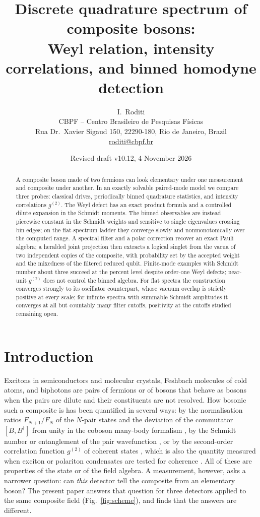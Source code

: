 \documentclass[11pt,a4paper]{article}
\title{Discrete quadrature spectrum of composite bosons:\\ Weyl relation, intensity correlations, and binned homodyne detection}
\author{I.~Roditi\\[4pt]
\small CBPF -- Centro Brasileiro de Pesquisas F\'isicas\\
\small Rua Dr.~Xavier Sigaud 150, 22290-180, Rio de Janeiro, Brazil\\
\small \href{mailto:roditi@cbpf.br}{roditi@cbpf.br}}
\date{Revised draft v10.12, 4 November 2026}
\begin{document}
\maketitle

\begin{abstract}
A composite boson made of two fermions can look elementary under one measurement and composite under another. In an exactly solvable paired-mode model we compare three probes: classical drives, periodically binned quadrature statistics, and intensity correlations $g^{(2)}$. The Weyl defect has an exact product formula and a controlled dilute expansion in the Schmidt moments. The binned observables are instead piecewise constant in the Schmidt weights and sensitive to single eigenvalues crossing bin edges; on the flat-spectrum ladder they converge slowly and nonmonotonically over the computed range. A spectral filter and a polar correction recover an exact Pauli algebra; a heralded joint projection then extracts a logical singlet from the vacua of two independent copies of the composite, with probability set by the accepted weight and the mixedness of the filtered reduced qubit. Finite-mode examples with Schmidt number about three succeed at the percent level despite order-one Weyl defects; near-unit $g^{(2)}$ does not control the binned algebra. For flat spectra the construction converges strongly to its oscillator counterpart, whose vacuum overlap is strictly positive at every scale; for infinite spectra with summable Schmidt amplitudes it converges at all but countably many filter cutoffs, positivity at the cutoffs studied remaining open.
\end{abstract}

\section{Introduction}

Excitons in semiconductors and molecular crystals, Feshbach molecules of cold atoms, and biphotons are pairs of fermions or of bosons that behave as bosons when the pairs are dilute and their constituents are not resolved. How bosonic such a composite is has been quantified in several ways: by the normalisation ratios $F_{N+1}/F_N$ of the $N$-pair states and the deviation of the commutator $[B,B^\dagger]$ from unity in the coboson many-body formalism \cite{Combescot2008,CombescotShiau2015,Shiau2017,Figueiredo2026}, by the Schmidt number or entanglement of the pair wavefunction \cite{Law2005,Chudzicki2010,Tichy2012,Tichy2014}, or by the second-order correlation function $g^{(2)}$ of coherent states \cite{Shiau2017}, which is also the quantity measured when exciton or polariton condensates are tested for coherence \cite{Kasprzak2006,Deng2010,Combescot2017}. All of these are properties of the state or of the field algebra. A measurement, however, asks a narrower question: can \emph{this} detector tell the composite from an elementary boson? The present paper answers that question for three detectors applied to the same composite field (Fig.~\ref{fig:scheme}), and finds that the answers are different.
\end{document}

